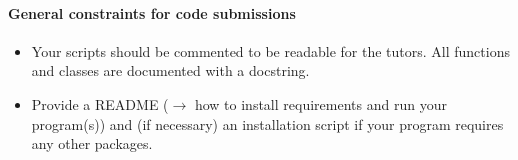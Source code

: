 \documentclass{exam}
\begin{document}
\bigskip
\paragraph{General constraints for code submissions}

\begin{itemize}
  \item Your scripts should be commented to be readable for the tutors. All functions and classes are documented with a docstring. 
  \item Provide a README ($\to$ how to install requirements and run your program(s)) and (if necessary) an installation script if your program requires any other packages.
\end{itemize}
\end{document}

